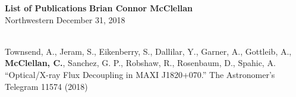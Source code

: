 \documentclass[letter, 12pt]{article}
\begin{document}
\noindent
\textbf{List of Publications}    \hfill \textbf{Brian Connor McClellan} \\
Northwestern                    \hfill December 31, 2018 \\
\\
\begin{hangparas}{0.25in}{1}

Townsend, A., Jeram, S., Eikenberry, S., Dallilar, Y., Garner, A., Gottleib, A., \textbf{McClellan, C.}, Sanchez, G. P., Robshaw, R., Rosenbaum, D., Spahic, A. ``Optical/X-ray Flux Decoupling in MAXI J1820+070.'' The Astronomer's Telegram 11574 (2018)

\end{hangparas}
\end{document}
